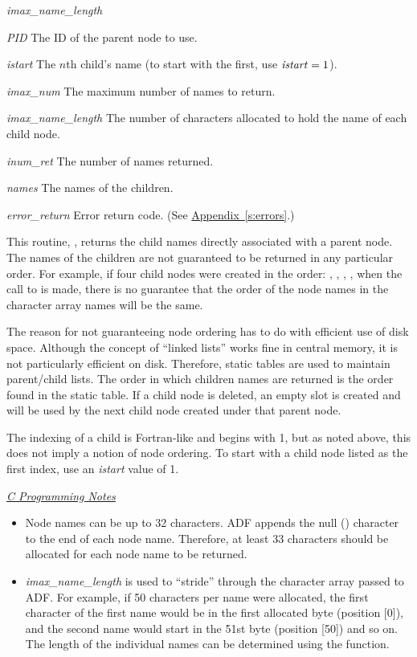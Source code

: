 \begin{Ventryi}{\textit{imax\_name\_length}}
\item[\textit{PID}]
     The ID of the parent node to use.
\item[\textit{istart}]
     The $n$th child's name (to start with the first, use
     $\text{\textit{istart}} = 1$).
\item[\textit{imax\_num}]
     The maximum number of names to return.
\item[\textit{imax\_name\_length}]
     The number of characters allocated to hold the name of each
     child node.
\item[\textit{inum\_ret}]
     The number of names returned.
\item[\textit{names}]
     The names of the children.
\item[\textit{error\_return}]
     Error return code.
     (See \hyperref[s:errors]{Appendix~\ref*{s:errors}}.)
\end{Ventryi}

This routine, , returns the child names
directly associated with a parent node.
The names of the children are not guaranteed to be returned in any
particular order.
For example, if four child nodes were created in the order:
, , , , when the
call to  is made, there is no guarantee that the order
of the node names in the character array names will be the same.

The reason for not guaranteeing node ordering has to do with efficient
use of disk space.
Although the concept of ``linked lists'' works fine in central memory, it
is not particularly efficient on disk.
Therefore, static tables are used to maintain parent/child lists.
The order in which children names are returned is the order found in the
static table.
If a child node is deleted, an empty slot is created and will be used by
the next child node created under that parent node.

The indexing of a child is Fortran-like and begins with 1, but as noted
above, this does not imply a notion of node ordering.
To start with a child node listed as the first index, use an
\textit{istart} value of 1.

\noindent
\uline{\textit{C Programming Notes}}
\begin{itemize}
\item Node names can be up to 32 characters.
      ADF appends the null () character to the
      end of each node name.
      Therefore, at least 33 characters should be allocated for each
      node name to be returned.
\item \textit{imax\_name\_length} is used to ``stride'' through the
      character array passed to ADF.
      For example, if 50 characters per name were allocated, the first
      character of the first name would be in the first allocated byte
      (position [0]), and the second name would start in the 51st byte
      (position [50]) and so on.
      The length of the individual names can be determined using the
       function.
\end{itemize}


